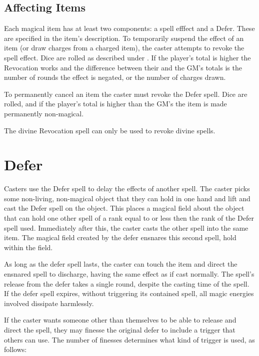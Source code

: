 \subsection{Affecting Items}

Each magical item has at least two components: a spell efffect and a Defer. These are specified in the item's description. To temporarily suspend the effect of an item (or draw charges from a charged item), the caster attempts to revoke the spell effect. Dice are rolled as described under . If the player’s total is higher the Revocation works and the difference between their and the GM's totals is the number of rounds the effect is negated, or the number of charges drawn.

To permanently cancel an item the caster must revoke the Defer spell. Dice are rolled, and if the player’s total is higher than the GM's the item is made permanently non-magical.

The divine Revocation spell can only be used to revoke divine spells.

\pagebreak

\section{Defer}


Casters use the Defer spell to delay the effects of another spell. The caster picks some non-living, non-magical object that they can hold in one hand and lift and cast the Defer spell on the object. This places a magical field about the object that can hold one other spell of a rank equal to or less then the rank of the Defer spell used. Immediately after this, the caster casts the other spell into the same item. The magical field created by the defer ensnares this second spell, hold within the field. 

As long as the defer spell lasts, the caster can touch the item and direct the ensnared spell to discharge, having the same effect as if cast normally. The spell’s release from the defer takes a single round, despite the casting time of the spell. If the defer spell expires, without triggering its contained spell, all magic energies involved dissipate harmlessly.

If the caster wants someone other than themselves to be able to release and direct the spell, they may finesse the original defer to include a trigger that others can use. The number of finesses determines what kind of trigger is used, as follows:

